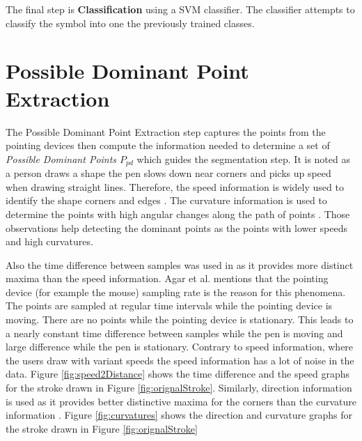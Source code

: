    The final step is \textbf{Classification} using a SVM classifier. The classifier attempts to classify the symbol into one the previously trained classes.%
 



\section{Possible Dominant Point Extraction}
\label{sec:Preprocessing}
The Possible Dominant Point Extraction step captures the points from the pointing devices then compute the information needed to determine a set of  \textit{Possible Dominant Points $P_{pd}$} which guides the segmentation step. It is noted as a person draws a shape the pen slows down near corners and picks up speed when drawing straight lines. Therefore, the speed information is widely used to identify the shape corners and edges \cite{earlyprocess}. The curvature information is used to determine the points with high angular changes along the path of points \cite{meanshift10}. Those observations help detecting the dominant points as the points with lower speeds and high curvatures. 

Also the time difference between samples was used in \cite{polygonfeedback31} as it provides more distinct maxima than the speed information. Agar et al. \cite{polygonfeedback31} mentions that the pointing device (for example the mouse) sampling rate is the reason for this phenomena. The points are sampled at regular time intervals while the pointing device is moving. There are no points while the pointing device is stationary. This leads to a nearly constant time difference between samples while the pen is moving and large difference while the pen is stationary. Contrary to speed information, where the users draw with variant speeds the speed information has a lot of noise in the data. Figure \ref{fig:speed2Distance} shows the time difference and the speed graphs for the stroke drawn in Figure \ref{fig:orignalStroke}.  Similarly, direction information is used as it provides better distinctive maxima for the corners than the curvature information \cite{meanshift10}. Figure \ref{fig:curvatures} shows the direction and curvature graphs for the stroke drawn in Figure \ref{fig:orignalStroke}

